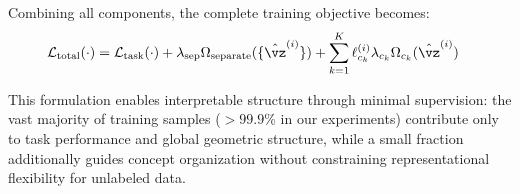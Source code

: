 Combining all components, the complete training objective becomes:
\begin{align}
    \mathcal{L}_{\text{total}}(\cdot) &= \mathcal{L}_{\text{task}}(\cdot) + \lambda_{\text{sep}} \Omega_{\text{separate}}(\{\hat{\vz}^{(i)}\}) + \sum_{k=1}^K \ell^{(i)}_{c_k} \lambda_{c_k} \Omega_{c_k}(\hat{\vz}^{(i)}) \label{eq:expanded_loss}
\end{align}

This formulation enables interpretable structure through minimal supervision: the vast majority of training samples ($>99.9\%$ in our experiments) contribute only to task performance and global geometric structure, while a small fraction additionally guides concept organization without constraining representational flexibility for unlabeled data.
